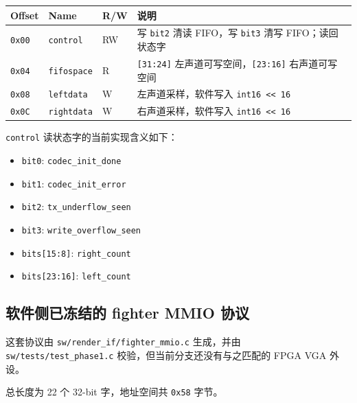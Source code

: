 \documentclass[12pt,a4paper]{ctexart}
\begin{document}
\begin{longtable}{>{\raggedright\arraybackslash}p{} >{\raggedright\arraybackslash}p{} >{\raggedright\arraybackslash}p{} >{\raggedright\arraybackslash}p{}}
\toprule
Offset & Name & R/W & 说明 \\
\midrule
\endhead
\texttt{0x00} & \texttt{control} & RW & 写 \texttt{bit2} 清读 FIFO，写 \texttt{bit3} 清写 FIFO；读回状态字 \\
\texttt{0x04} & \texttt{fifospace} & R & \texttt{[31:24]} 左声道可写空间，\texttt{[23:16]} 右声道可写空间 \\
\texttt{0x08} & \texttt{leftdata} & W & 左声道采样，软件写入 \texttt{int16 << 16} \\
\texttt{0x0C} & \texttt{rightdata} & W & 右声道采样，软件写入 \texttt{int16 << 16} \\
\bottomrule
\end{longtable}

\noindent \texttt{control} 读状态字的当前实现含义如下：

\begin{itemize}
  \item \texttt{bit0}: \texttt{codec\_init\_done}
  \item \texttt{bit1}: \texttt{codec\_init\_error}
  \item \texttt{bit2}: \texttt{tx\_underflow\_seen}
  \item \texttt{bit3}: \texttt{write\_overflow\_seen}
  \item \texttt{bits[15:8]}: \texttt{right\_count}
  \item \texttt{bits[23:16]}: \texttt{left\_count}
\end{itemize}

\subsection{软件侧已冻结的 fighter MMIO 协议}

这套协议由 \texttt{sw/render\_if/fighter\_mmio.c} 生成，并由 \texttt{sw/tests/test\_phase1.c} 校验，但当前分支还没有与之匹配的 FPGA VGA 外设。

总长度为 22 个 32-bit 字，地址空间共 \texttt{0x58} 字节。
\end{document}
